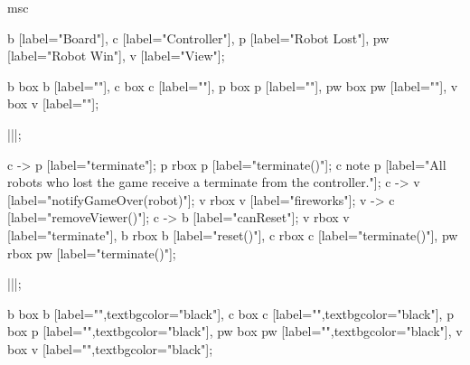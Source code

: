 \begin{msc}
msc
{

b [label="Board"],
c [label="Controller"],
p [label="Robot Lost"],
pw [label="Robot Win"],
v [label="View"];

b box b [label=""],
c box c [label=""],
p box p [label=""],
pw box pw [label=""],
v box v [label=""];

|||;

c -> p [label="terminate"];
p rbox p [label="terminate()"];
c note p [label="All robots who lost the game receive a terminate from the controller."];
c -> v [label="notifyGameOver(robot)"];
v rbox v [label="fireworks"];
v -> c [label="removeViewer()"];
c -> b [label="canReset"];
v rbox v [label="terminate"],
b rbox b [label="reset()"],
c rbox c [label="terminate()"],
pw rbox pw [label="terminate()"];


|||;

b box b [label="",textbgcolor="black"],
c box c [label="",textbgcolor="black"],
p box p [label="",textbgcolor="black"],
pw box pw [label="",textbgcolor="black"],
v box v [label="",textbgcolor="black"];

}
\end{msc}
